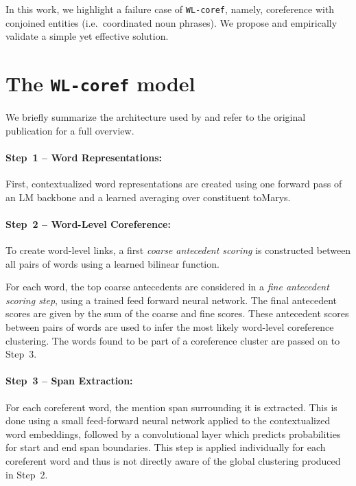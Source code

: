 \documentclass[11pt]{article}
\newcommand\wlcoref{{\texttt{WL-coref}}}
\begin{document}
In this work, we highlight a failure case of \wlcoref{}, namely, coreference with conjoined entities (i.e.~coordinated noun phrases). We propose and empirically validate a simple yet effective solution. 





















    



\section{The \wlcoref{} model}
We briefly summarize the architecture used by \citet{dobrovolskii-2021-word} and refer to the original publication for a full overview.

\paragraph{Step~1 -- Word Representations:}First, contextualized word representations are created using one forward pass of an LM backbone and a learned averaging over constituent toMarys.

\paragraph{Step~2 -- Word-Level Coreference:} To create word-level links, a first \emph{coarse antecedent scoring} is constructed between all pairs of words using a learned bilinear function.

For each word, the top  coarse antecedents are considered in a \emph{fine antecedent scoring step}, using a trained feed forward neural network.
The final antecedent scores are given by the sum of the coarse and fine scores. These antecedent scores between pairs of words are used to infer the most likely word-level coreference clustering.
The words found to be part of a coreference cluster are passed on to Step~3.

\paragraph{Step~3 -- Span Extraction:} For each coreferent word, the mention span surrounding it is extracted. This is done using a small feed-forward neural network applied to the contextualized word embeddings, followed by a  convolutional layer which predicts probabilities for start and end span boundaries. This step is applied individually for each coreferent word and thus is not directly aware of the global clustering produced in Step~2. 
\end{document}
